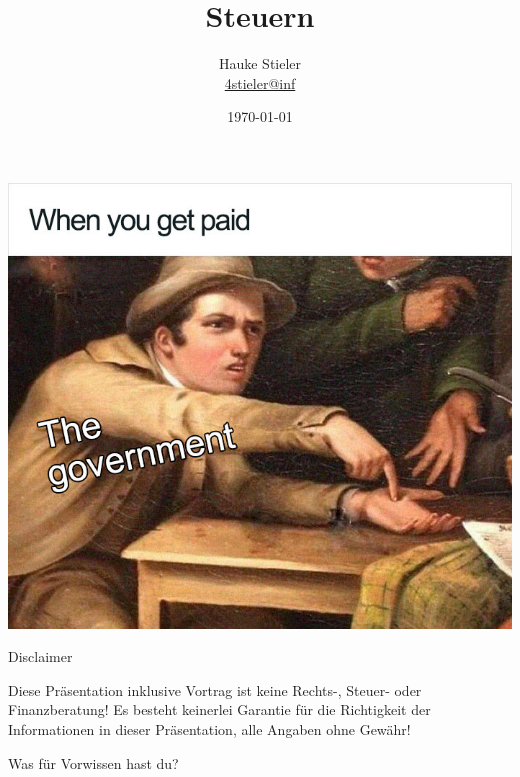\documentclass{beamer}
\author[Hauke Stieler]{Hauke Stieler\\\href{mailto:4stieler@informatik.uni-hamburg.de}{4stieler@inf}}
\title{Steuern}
\date{\today}
\begin{document}
	{
		\begin{frame}
			\includegraphics[width=\paperwidth,trim=2cm 2cm -1.9cm 3.35cm]{images/tax-government}
		\end{frame}
		\addtocounter{page}{-1}
	}

	{
		\maketitle
		\addtocounter{page}{-1}
	}
	
	\begin{frame}{Disclaimer}
		\begin{center}
			Diese Präsentation inklusive Vortrag ist keine Rechts-, Steuer- oder Finanzberatung!\n
			Es besteht keinerlei Garantie für die Richtigkeit der Informationen in dieser Präsentation, alle Angaben ohne Gewähr!\n
		\end{center}
	\end{frame}

	\begin{frame}
		\begin{center}
			Was für Vorwissen hast du?
		\end{center}
	\end{frame}
\end{document}
